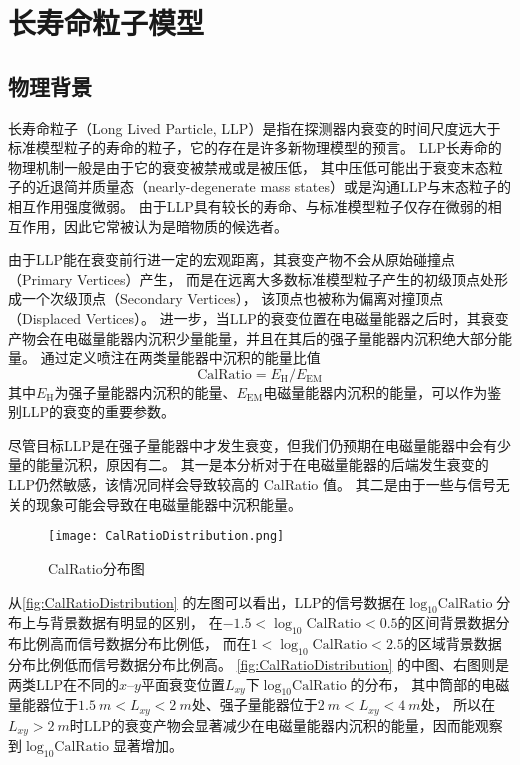 
\chapter{长寿命粒子模型}

\section{物理背景}
长寿命粒子（Long Lived Particle, LLP）是指在探测器内衰变的时间尺度远大于标准模型粒子的寿命的粒子，它的存在是许多新物理模型的预言。
LLP长寿命的物理机制一般是由于它的衰变被禁戒或是被压低，
其中压低可能出于衰变末态粒子的近退简并质量态（nearly-degenerate mass states）或是沟通LLP与末态粒子的相互作用强度微弱。
由于LLP具有较长的寿命、与标准模型粒子仅存在微弱的相互作用，因此它常被认为是暗物质的候选者。

由于LLP能在衰变前行进一定的宏观距离，其衰变产物不会从原始碰撞点（Primary Vertices）产生，
而是在远离大多数标准模型粒子产生的初级顶点处形成一个次级顶点（Secondary Vertices），
该顶点也被称为偏离对撞顶点（Displaced Vertices）。
进一步，当LLP的衰变位置在电磁量能器之后时，其衰变产物会在电磁量能器内沉积少量能量，并且在其后的强子量能器内沉积绝大部分能量。
通过定义喷注在两类量能器中沉积的能量比值$$\text{CalRatio}=E_{\text{H}}/E_{\text{EM}}$$
其中$E_{\text{H}}$为强子量能器内沉积的能量、$E_{\text{EM}}$电磁量能器内沉积的能量，可以作为鉴别LLP的衰变的重要参数。
\cite{calratio}

尽管目标LLP是在强子量能器中才发生衰变，但我们仍预期在电磁量能器中会有少量的能量沉积，原因有二。
其一是本分析对于在电磁量能器的后端发生衰变的LLP仍然敏感，该情况同样会导致较高的 CalRatio 值。
其二是由于一些与信号无关的现象可能会导致在电磁量能器中沉积能量。

\begin{figure}[ht]
    \centering
    \texttt{[image: CalRatioDistribution.png]}
    \caption{CalRatio分布图}
    \label{fig:CalRatioDistribution}
\end{figure}

从\autoref{fig:CalRatioDistribution} 的左图可以看出，LLP的信号数据在$\log_{10}\text{CalRatio}$分布上与背景数据有明显的区别，
在$-1.5<\log_{10}\text{CalRatio}<0.5$的区间背景数据分布比例高而信号数据分布比例低，
而在$1<\log_{10}\text{CalRatio}<2.5$的区域背景数据分布比例低而信号数据分布比例高。
\autoref{fig:CalRatioDistribution} 的中图、右图则是两类LLP在不同的$x$--$y$平面衰变位置$L_{xy}$下$\log_{10}\text{CalRatio}$的分布，
其中筒部的电磁量能器位于$\SI{1.5}{m} < L_{xy} < \SI{2}{m}$处、强子量能器位于$\SI{2}{m} < L_{xy} < \SI{4}{m}$处，
所以在$L_{xy} > \SI{2}{m}$时LLP的衰变产物会显著减少在电磁量能器内沉积的能量，因而能观察到$\log_{10}\text{CalRatio}$显著增加。

